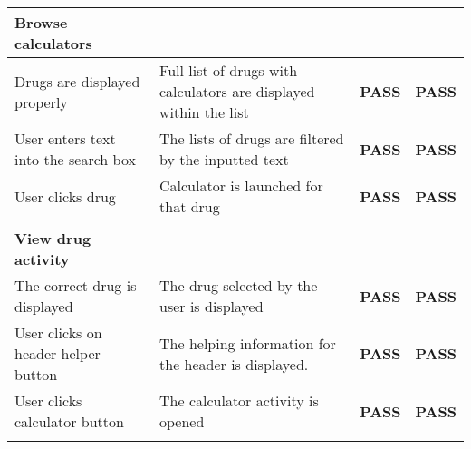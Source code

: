 \documentclass[11pt,fleqn,twoside]{article}
\begin{document}
\begin{center}
\begin{longtable}{| p{5cm} | p{5cm} | c | c |}
\textbf{Browse calculators}                                                &                                                                                                  & \textbf{}             & \textbf{}              \\ \hline
Drugs are displayed properly                                               & Full list of drugs with calculators are displayed within the list                                & \textbf{PASS}         & \textbf{PASS}          \\ \hline
User enters text into the search box                                       & The lists of drugs are filtered by the inputted text                                             & \textbf{PASS}         & \textbf{PASS}          \\ \hline
User clicks drug                                                           & Calculator is launched for that drug                                                             & \textbf{PASS}         & \textbf{PASS}          \\ \hline
                                                                           &                                                                                                  & \textbf{}             & \textbf{}              \\ \hline
\textbf{View drug activity}                                                &                                                                                                  & \textbf{}             & \textbf{}              \\ \hline
The correct drug is displayed                                              & The drug selected by the user is displayed                                                       & \textbf{PASS}         & \textbf{PASS}          \\ \hline
User clicks on header helper button                                        & The helping information for the header is displayed.                                             & \textbf{PASS}         & \textbf{PASS}          \\ \hline
User clicks calculator button                                              & The calculator activity is opened                                                                & \textbf{PASS}         & \textbf{PASS}          \\ \hline
                                                                           &                                                                                                  & \textbf{}             & \textbf{}              \\ \hline

\end{longtable}
\end{center}
\end{document}
